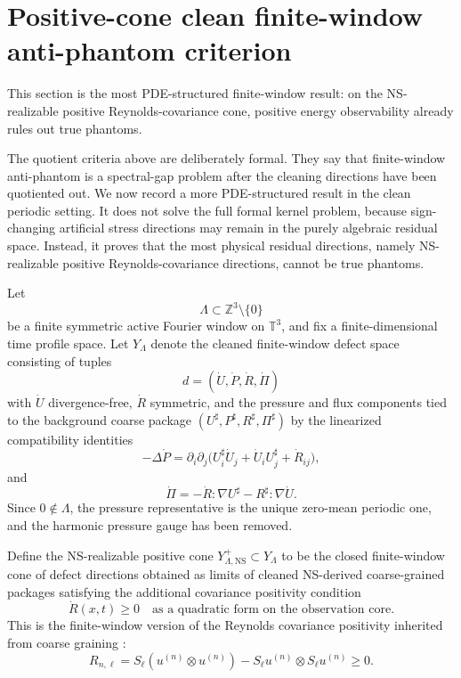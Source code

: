 \documentclass[11pt]{article}
\numberwithin{equation}{section}
\newcommand{\Z}{\mathbb Z}
\newcommand{\NS}{\mathrm{NS}}
\begin{document}
\section{Positive-cone clean finite-window anti-phantom criterion}\label{sec:positive-cone-antiphantom}
\noindent This section is the most PDE-structured finite-window result: on the NS-realizable positive Reynolds-covariance cone, positive energy observability already rules out true phantoms.\label{subsec:ns-positive-antiphantom}

The quotient criteria above are deliberately formal.  They say that finite-window anti-phantom is a spectral-gap problem after the cleaning directions have been quotiented out.  We now record a more PDE-structured result in the clean periodic setting.  It does not solve the full formal kernel problem, because sign-changing artificial stress directions may remain in the purely algebraic residual space.  Instead, it proves that the most physical residual directions, namely NS-realizable positive Reynolds-covariance directions, cannot be true phantoms.

Let
\[
    \Lambda\subset \Z^3\setminus\{0\}
\]
be a finite symmetric active Fourier window on \(\mathbb T^3\), and fix a finite-dimensional time profile space.  Let \(Y_\Lambda\) denote the cleaned finite-window defect space consisting of tuples
\[
    d=(\dot U,\dot P,\dot R,\dot\Pi)
\]
with \(\dot U\) divergence-free, \(\dot R\) symmetric, and the pressure and flux components tied to the background coarse package \((U^\sharp,P^\sharp,R^\sharp,\Pi^\sharp)\) by the linearized compatibility identities
\begin{equation}\label{eq:pc-positive-cone}
    -\Delta \dot P
    =
    \partial_i\partial_j
    \bigl(U_i^\sharp \dot U_j+
          \dot U_i U_j^\sharp+
          \dot R_{ij}\bigr),
\end{equation}
and
\begin{equation}\label{eq:fi-positive-cone}
    \dot\Pi
    =
    -\dot R:\nabla U^\sharp
    -R^\sharp:\nabla\dot U .
\end{equation}
Since \(0\notin\Lambda\), the pressure representative is the unique zero-mean periodic one, and the harmonic pressure gauge has been removed.

Define the NS-realizable positive cone \(Y_{\Lambda,\NS}^{+}\subset Y_\Lambda\) to be the closed finite-window cone of defect directions obtained as limits of cleaned NS-derived coarse-grained packages satisfying the additional covariance positivity condition
\begin{equation}\label{eq:positive-cone-condition}
    \dot R(x,t)\ge 0
    \quad\text{as a quadratic form on the observation core.}
\end{equation}
This is the finite-window version of the Reynolds covariance positivity inherited from coarse graining \cite{ConstantinETiti1994,DuchonRobert2000,LeslieShvydkoy2018}:
\[
    R_{n,\ell}=S_\ell(u^{(n)}\otimes u^{(n)})-S_\ell u^{(n)}\otimes S_\ell u^{(n)}\ge0.
\]
\end{document}
